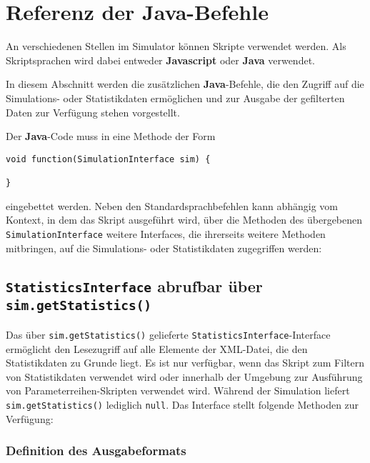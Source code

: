 \part{Referenz der Java-Befehle}

An verschiedenen Stellen im Simulator können Skripte verwendet werden.
Als Skriptsprachen wird dabei entweder \textbf{Javascript} oder \textbf{Java} verwendet.

In diesem Abschnitt werden die zusätzlichen \textbf{Java}-Befehle, die den
Zugriff auf die Simulations- oder Statistikdaten ermöglichen und zur Ausgabe
der gefilterten Daten zur Verfügung stehen vorgestellt.

Der \textbf{Java}-Code muss in eine Methode der Form
\begin{verbatim}
void function(SimulationInterface sim) {

}
\end{verbatim}
eingebettet werden. Neben den Standardsprachbefehlen kann
abhängig vom Kontext, in dem das Skript ausgeführt wird,
über die Methoden des übergebenen \texttt{SimulationInterface}
weitere Interfaces, die ihrerseits weitere Methoden mitbringen,
auf die Simulations- oder Statistikdaten zugegriffen werden:

\chapter{\texttt{StatisticsInterface} abrufbar über \texttt{sim.getStatistics()}}

Das über \texttt{sim.getStatistics()} gelieferte \texttt{StatisticsInterface}-Interface
ermöglicht den Lesezugriff auf alle Elemente der XML-Datei, die den Statistikdaten
zu Grunde liegt. Es ist nur verfügbar, wenn das Skript zum Filtern von Statistikdaten verwendet wird oder innerhalb
der Umgebung zur Ausführung von Parameterreihen-Skripten verwendet wird. Während der
Simulation liefert \texttt{sim.getStatistics()} lediglich \texttt{null}.
Das Interface stellt folgende Methoden zur Verfügung:



\section{Definition des Ausgabeformats}

